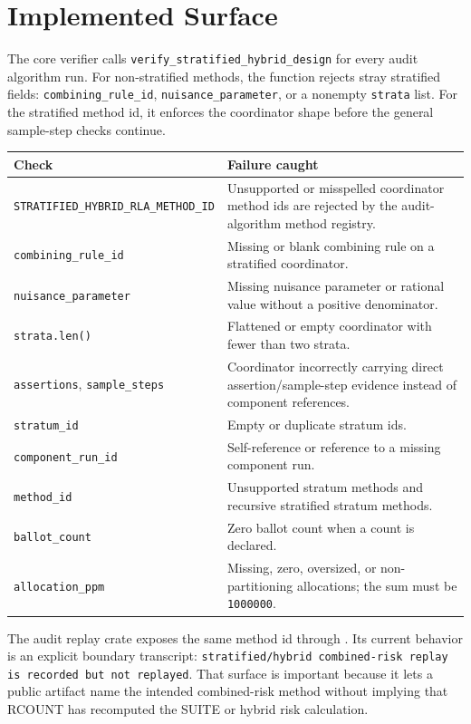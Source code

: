 \section{Implemented Surface}

The core verifier calls \texttt{verify\_stratified\_hybrid\_design} for every
audit algorithm run. For non-stratified methods, the function rejects stray
stratified fields: \texttt{combining\_rule\_id},
\texttt{nuisance\_parameter}, or a nonempty \texttt{strata} list. For the
stratified method id, it enforces the coordinator shape before the general
sample-step checks continue.

\begin{center}
\small
\begin{tabularx}{\textwidth}{lX}
\toprule
Check & Failure caught \\
\midrule
\texttt{STRATIFIED\_HYBRID\_RLA\_METHOD\_ID} & Unsupported or misspelled coordinator method ids are rejected by the audit-algorithm method registry. \\
\texttt{combining\_rule\_id} & Missing or blank combining rule on a stratified coordinator. \\
\texttt{nuisance\_parameter} & Missing nuisance parameter or rational value without a positive denominator. \\
\texttt{strata.len()} & Flattened or empty coordinator with fewer than two strata. \\
\texttt{assertions}, \texttt{sample\_steps} & Coordinator incorrectly carrying direct assertion/sample-step evidence instead of component references. \\
\texttt{stratum\_id} & Empty or duplicate stratum ids. \\
\texttt{component\_run\_id} & Self-reference or reference to a missing component run. \\
\texttt{method\_id} & Unsupported stratum methods and recursive stratified stratum methods. \\
\texttt{ballot\_count} & Zero ballot count when a count is declared. \\
\texttt{allocation\_ppm} & Missing, zero, oversized, or non-partitioning allocations; the sum must be \texttt{1000000}. \\
\bottomrule
\end{tabularx}
\end{center}

The audit replay crate exposes the same method id through
. Its current behavior is an
explicit boundary transcript: \texttt{stratified/hybrid combined-risk replay is
recorded but not replayed}. That surface is important because it lets a public
artifact name the intended combined-risk method without implying that RCOUNT
has recomputed the SUITE or hybrid risk calculation.

